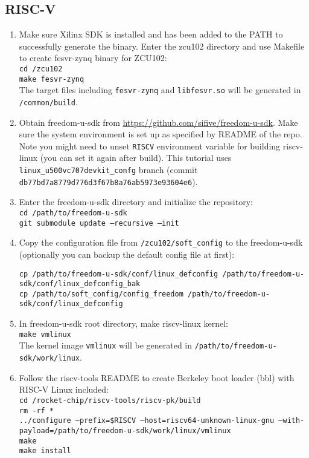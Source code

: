 \documentclass[a4paper,11pt]{article}
\begin{document}
\subsection{RISC-V}\label{sec:riscvsw}
\begin{enumerate}
\item Make sure Xilinx SDK is installed and has been added to the PATH to successfully generate the binary. 
Enter the zcu102 directory and use Makefile to create fesvr-zynq binary for ZCU102:\\
{\tt cd \rootdir/zcu102}\\
{\tt make fesvr-zynq}\\
The target files including \texttt{fesvr-zynq} and \texttt{libfesvr.so} will be generated in \texttt{\rootdir/common/build}.


\item Obtain freedom-u-sdk from \url{https://github.com/sifive/freedom-u-sdk}.
Make sure the system environment is set up as specified by README of the repo. Note you might need to unset \texttt{RISCV} environment variable for building riscv-linux (you can set it again after build). This tutorial uses {\tt linux\_u500vc707devkit\_confg} branch (commit {\tt db77bd7a8779d776d3f67b8a76ab5973e93604e6}).

\item Enter the freedom-u-sdk directory and initialize the repository:\\
\texttt{cd /path/to/freedom-u-sdk}\\
\texttt{git submodule update --recursive --init}

\item Copy the configuration file from {\tt \rootdir/zcu102/soft\_config} to the freedom-u-sdk (optionally you can backup the default config file at first):
\begin{lstlisting}
cp /path/to/freedom-u-sdk/conf/linux_defconfig /path/to/freedom-u-sdk/conf/linux_defconfig_bak
cp /path/to/soft_config/config_freedom /path/to/freedom-u-sdk/conf/linux_defconfig
\end{lstlisting}

\item In freedom-u-sdk root directory, make riscv-linux kernel:\\
{\tt make vmlinux}\\
The kernel image {\tt vmlinux} will be generated in \texttt{/path/to/freedom-u-sdk/work/linux}.

\item Follow the riscv-tools README to create Berkeley boot loader (bbl) with RISC-V Linux included:\\
{\tt cd \rootdir/rocket-chip/riscv-tools/riscv-pk/build\\
rm -rf *\\
../configure --prefix=\$RISCV --host=riscv64-unknown-linux-gnu --with-payload=/path/to/freedom-u-sdk/work/linux/vmlinux\\
make\\
make install}


\end{enumerate}
\end{document}
